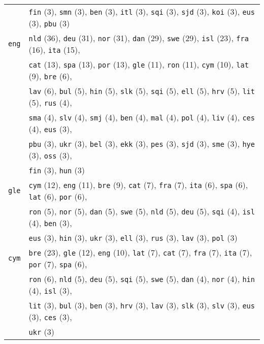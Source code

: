\begin{center}
\begin{longtable}{ll}
 & \texttt{fin} (3), \texttt{smn} (3), \texttt{ben} (3), \texttt{itl} (3), \texttt{sqi} (3), \texttt{sjd} (3), \texttt{koi} (3), \texttt{eus} (3), \texttt{pbu} (3) \\
\texttt{eng} & \texttt{nld} (36), \texttt{deu} (31), \texttt{nor} (31), \texttt{dan} (29), \texttt{swe} (29), \texttt{isl} (23), \texttt{fra} (16), \texttt{ita} (15),\\
 & \texttt{cat} (13), \texttt{spa} (13), \texttt{por} (13), \texttt{gle} (11), \texttt{ron} (11), \texttt{cym} (10), \texttt{lat} (9), \texttt{bre} (6),\\
 & \texttt{lav} (6), \texttt{bul} (5), \texttt{hin} (5), \texttt{slk} (5), \texttt{sqi} (5), \texttt{ell} (5), \texttt{hrv} (5), \texttt{lit} (5), \texttt{rus} (4),\\
 & \texttt{sma} (4), \texttt{slv} (4), \texttt{smj} (4), \texttt{ben} (4), \texttt{mal} (4), \texttt{pol} (4), \texttt{liv} (4), \texttt{ces} (4), \texttt{eus} (3),\\
 & \texttt{pbu} (3), \texttt{ukr} (3), \texttt{bel} (3), \texttt{ekk} (3), \texttt{pes} (3), \texttt{sjd} (3), \texttt{sme} (3), \texttt{hye} (3), \texttt{oss} (3),\\
 & \texttt{fin} (3), \texttt{hun} (3) \\
\texttt{gle} & \texttt{cym} (12), \texttt{eng} (11), \texttt{bre} (9), \texttt{cat} (7), \texttt{fra} (7), \texttt{ita} (6), \texttt{spa} (6), \texttt{lat} (6), \texttt{por} (6), \\
 & \texttt{ron} (5), \texttt{nor} (5), \texttt{dan} (5), \texttt{swe} (5), \texttt{nld} (5), \texttt{deu} (5), \texttt{sqi} (4), \texttt{isl} (4), \texttt{ben} (3), \\
 & \texttt{eus} (3), \texttt{hin} (3), \texttt{ukr} (3), \texttt{ell} (3), \texttt{rus} (3), \texttt{lav} (3), \texttt{pol} (3) \\
\texttt{cym} & \texttt{bre} (23), \texttt{gle} (12), \texttt{eng} (10), \texttt{lat} (7), \texttt{cat} (7), \texttt{fra} (7), \texttt{ita} (7), \texttt{por} (7), \texttt{spa} (6), \\
 & \texttt{ron} (6), \texttt{nld} (5), \texttt{deu} (5), \texttt{sqi} (5), \texttt{swe} (5), \texttt{dan} (4), \texttt{nor} (4), \texttt{hin} (4), \texttt{isl} (3), \\
 & \texttt{lit} (3), \texttt{bul} (3), \texttt{ben} (3), \texttt{hrv} (3), \texttt{lav} (3), \texttt{slk} (3), \texttt{slv} (3), \texttt{eus} (3), \texttt{ces} (3), \\
 & \texttt{ukr} (3) \\

\end{longtable}
\end{center}
